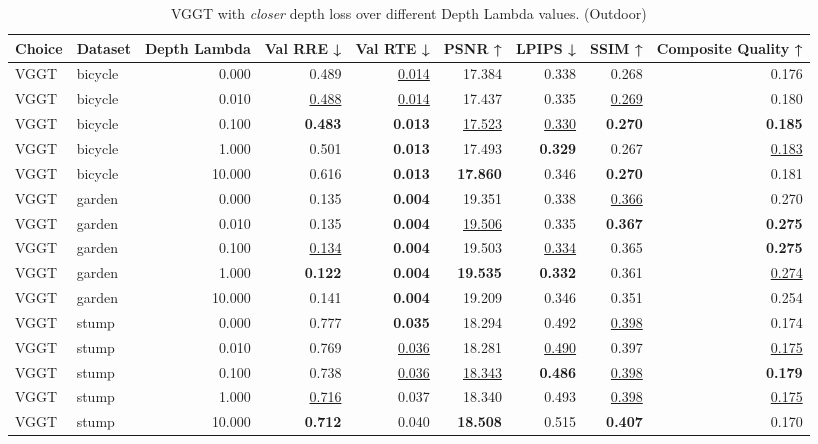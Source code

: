 \begin{table}[H]
\caption{\ifdefined\customcaption \customcaption \else VGGT with \textit{closer} depth loss over different Depth Lambda values. (Outdoor) \fi}
\label{tab:05_depth_lambda_outdoor}
\centering
\scriptsize
\begin{tabular}{llrrrrrrr}
\toprule
Choice & Dataset & Depth Lambda & Val RRE ↓ & Val RTE ↓ & PSNR ↑ & LPIPS ↓ & SSIM ↑ & Composite Quality ↑ \\
\midrule
VGGT & bicycle & 0.000 & 0.489 & \underline{0.014} & 17.384 & 0.338 & 0.268 & 0.176 \\
VGGT & bicycle & 0.010 & \underline{0.488} & \underline{0.014} & 17.437 & 0.335 & \underline{0.269} & 0.180 \\
VGGT & bicycle & 0.100 & \textbf{0.483} & \textbf{0.013} & \underline{17.523} & \underline{0.330} & \textbf{0.270} & \textbf{0.185} \\
VGGT & bicycle & 1.000 & 0.501 & \textbf{0.013} & 17.493 & \textbf{0.329} & 0.267 & \underline{0.183} \\
VGGT & bicycle & 10.000 & 0.616 & \textbf{0.013} & \textbf{17.860} & 0.346 & \textbf{0.270} & 0.181 \\
\midrule
VGGT & garden & 0.000 & 0.135 & \textbf{0.004} & 19.351 & 0.338 & \underline{0.366} & 0.270 \\
VGGT & garden & 0.010 & 0.135 & \textbf{0.004} & \underline{19.506} & 0.335 & \textbf{0.367} & \textbf{0.275} \\
VGGT & garden & 0.100 & \underline{0.134} & \textbf{0.004} & 19.503 & \underline{0.334} & 0.365 & \textbf{0.275} \\
VGGT & garden & 1.000 & \textbf{0.122} & \textbf{0.004} & \textbf{19.535} & \textbf{0.332} & 0.361 & \underline{0.274} \\
VGGT & garden & 10.000 & 0.141 & \textbf{0.004} & 19.209 & 0.346 & 0.351 & 0.254 \\
\midrule
VGGT & stump & 0.000 & 0.777 & \textbf{0.035} & 18.294 & 0.492 & \underline{0.398} & 0.174 \\
VGGT & stump & 0.010 & 0.769 & \underline{0.036} & 18.281 & \underline{0.490} & 0.397 & \underline{0.175} \\
VGGT & stump & 0.100 & 0.738 & \underline{0.036} & \underline{18.343} & \textbf{0.486} & \underline{0.398} & \textbf{0.179} \\
VGGT & stump & 1.000 & \underline{0.716} & 0.037 & 18.340 & 0.493 & \underline{0.398} & \underline{0.175} \\
VGGT & stump & 10.000 & \textbf{0.712} & 0.040 & \textbf{18.508} & 0.515 & \textbf{0.407} & 0.170 \\
\bottomrule
\end{tabular}
\end{table}